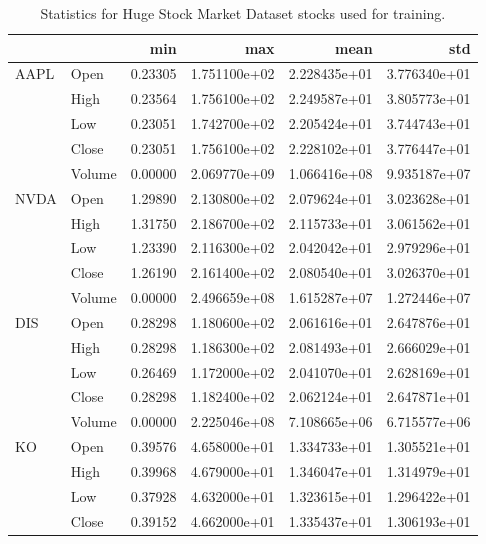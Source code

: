 \begin{table}
\centering
\caption{Statistics for Huge Stock Market Dataset stocks used for training.}
\label{table:dataset_metrics}
\begin{tabular}{llrrrr}
\toprule
   &        &      min &           max &          mean &           std \\
\midrule
\multirow{5}{*}{AAPL} & Open &  0.23305 &  1.751100e+02 &  2.228435e+01 &  3.776340e+01 \\
   & High &  0.23564 &  1.756100e+02 &  2.249587e+01 &  3.805773e+01 \\
   & Low &  0.23051 &  1.742700e+02 &  2.205424e+01 &  3.744743e+01 \\
   & Close &  0.23051 &  1.756100e+02 &  2.228102e+01 &  3.776447e+01 \\
   & Volume &  0.00000 &  2.069770e+09 &  1.066416e+08 &  9.935187e+07 \\
\cline{1-6}
\multirow{5}{*}{NVDA} & Open &  1.29890 &  2.130800e+02 &  2.079624e+01 &  3.023628e+01 \\
   & High &  1.31750 &  2.186700e+02 &  2.115733e+01 &  3.061562e+01 \\
   & Low &  1.23390 &  2.116300e+02 &  2.042042e+01 &  2.979296e+01 \\
   & Close &  1.26190 &  2.161400e+02 &  2.080540e+01 &  3.026370e+01 \\
   & Volume &  0.00000 &  2.496659e+08 &  1.615287e+07 &  1.272446e+07 \\
\cline{1-6}
\multirow{5}{*}{DIS} & Open &  0.28298 &  1.180600e+02 &  2.061616e+01 &  2.647876e+01 \\
   & High &  0.28298 &  1.186300e+02 &  2.081493e+01 &  2.666029e+01 \\
   & Low &  0.26469 &  1.172000e+02 &  2.041070e+01 &  2.628169e+01 \\
   & Close &  0.28298 &  1.182400e+02 &  2.062124e+01 &  2.647871e+01 \\
   & Volume &  0.00000 &  2.225046e+08 &  7.108665e+06 &  6.715577e+06 \\
\cline{1-6}
\multirow{5}{*}{KO} & Open &  0.39576 &  4.658000e+01 &  1.334733e+01 &  1.305521e+01 \\
   & High &  0.39968 &  4.679000e+01 &  1.346047e+01 &  1.314979e+01 \\
   & Low &  0.37928 &  4.632000e+01 &  1.323615e+01 &  1.296422e+01 \\
   & Close &  0.39152 &  4.662000e+01 &  1.335437e+01 &  1.306193e+01 \\

\end{tabular}
\end{table}
